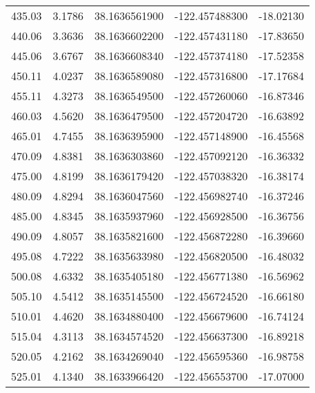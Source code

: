 \begin{scriptsize}
\begin{longtable}{p{2.5cm}p{2.5cm}p{3cm}p{3cm}p{2.5cm}}
           435.03  & 	 3.1786 &               38.1636561900  &   -122.457488300   &	-18.02130 \\
           440.06  & 	 3.3636 &               38.1636602200  &   -122.457431180   &	-17.83650 \\
           445.06  & 	 3.6767 &               38.1636608340  &   -122.457374180   &	-17.52358 \\
           450.11  & 	 4.0237 &               38.1636589080  &   -122.457316800   &	-17.17684 \\
           455.11  & 	 4.3273 &               38.1636549500  &   -122.457260060   &	-16.87346 \\
           460.03  & 	 4.5620 &               38.1636479500  &   -122.457204720   &	-16.63892 \\
           465.01  & 	 4.7455 &               38.1636395900  &   -122.457148900   &	-16.45568 \\
           470.09  & 	 4.8381 &               38.1636303860  &   -122.457092120   &	-16.36332 \\
           475.00  & 	 4.8199 &               38.1636179420  &   -122.457038320   &	-16.38174 \\
           480.09  & 	 4.8294 &               38.1636047560  &   -122.456982740   &	-16.37246 \\
           485.00  & 	 4.8345 &               38.1635937960  &   -122.456928500   &	-16.36756 \\
           490.09  & 	 4.8057 &               38.1635821600  &   -122.456872280   &	-16.39660 \\
           495.08  & 	 4.7222 &               38.1635633980  &   -122.456820500   &	-16.48032 \\
           500.08  & 	 4.6332 &               38.1635405180  &   -122.456771380   &	-16.56962 \\
           505.10  & 	 4.5412 &               38.1635145500  &   -122.456724520   &	-16.66180 \\
           510.01  & 	 4.4620 &               38.1634880400  &   -122.456679600   &	-16.74124 \\
           515.04  & 	 4.3113 &               38.1634574520  &   -122.456637300   &	-16.89218 \\
           520.05  & 	 4.2162 &               38.1634269040  &   -122.456595360   &	-16.98758 \\
           525.01  & 	 4.1340 &               38.1633966420  &   -122.456553700   &	-17.07000 \\

\end{longtable}
\end{scriptsize}
